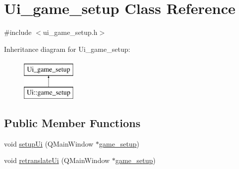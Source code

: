 \hypertarget{classUi__game__setup}{\section{Ui\-\_\-game\-\_\-setup Class Reference}
\label{classUi__game__setup}
}


{\ttfamily \#include $<$ui\-\_\-game\-\_\-setup.\-h$>$}

Inheritance diagram for Ui\-\_\-game\-\_\-setup\-:\begin{figure}[H]
\begin{center}
\leavevmode
\includegraphics[height=2.000000cm]{classUi__game__setup}
\end{center}
\end{figure}
\subsection*{Public Member Functions}
\begin{DoxyCompactItemize}
\item 
void \hyperlink{classUi__game__setup_a106d59c06db7a08cb512d2491e65f587}{setup\-Ui} (Q\-Main\-Window $\ast$\hyperlink{classgame__setup}{game\-\_\-setup})
\item 
void \hyperlink{classUi__game__setup_a8f65fdf39c952a235cd75ff04d3a0167}{retranslate\-Ui} (Q\-Main\-Window $\ast$\hyperlink{classgame__setup}{game\-\_\-setup})
\end{DoxyCompactItemize}

